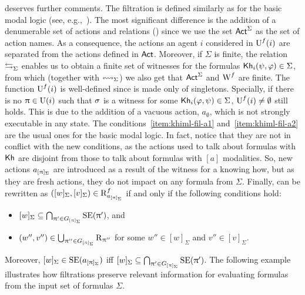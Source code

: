  deserves further comments.
The filtration is defined similarly as for the basic modal logic (see, e.g.,~\cite{mlbook}).
The most significant difference is the addition of a denumerable set of actions and relations () since we use the set ${\rm \sf Act}^\Sigma$ as the set of action names.
As a consequence, the actions an agent $i$ considered in $\operatorname{U}^f(i)$ are separated from the actions defined in ${\rm \sf Act}$.
Moreover, if $\Sigma$ is finite, the relation $\mathrel{\leftrightarrows}_\Sigma$ enables us to obtain a finite set of witnesses for the formulas ${\sf Kh}_i(\psi,\varphi) \in \Sigma$, from which (together with $\leftrightsquigarrow_\Sigma$) we also get that ${\rm \sf Act}^\Sigma$ and $\operatorname{W}^f$ are finite.
The function $\operatorname{U}^f(i)$ is well-defined since is made only of singletons. Specially, if there is no $\uppi \in \operatorname{U}(i)$ such that $\sigma$ is a witness for some ${\sf Kh}_i(\varphi,\psi) \in \Sigma$, $\operatorname{U}^f(i)\neq \emptyset$ still holds.
This is due to the addition of a vacuous action, $a_\emptyset$, which is not strongly executable in any state.
The conditions~\ref{item:khiml-fil-a1} and~\ref{item:khiml-fil-a2} are the usual ones for the basic modal logic.
In fact, notice that they are not in conflict with the new conditions, as the actions used to talk about formulas with ${\sf Kh}$ are disjoint from those to talk about formulas with $[a]$ modalities.
So, new actions $a_{[\uppi]_\Sigma}$ are introduced as a result of the witness for a knowing how, but as they are fresh actions, they do not impact on any formula from $\Sigma$.
Finally,  can be rewritten as $([w]_\Sigma,[v]_\Sigma) \in \operatorname{R}^f_{a_{[\uppi]_\Sigma}}$ if and only if the following conditions hold:

\begin{itemize}
\item $[w]_\Sigma \subseteq \bigcap_{\uppi' \in G_{[\uppi]_\Sigma}} \operatorname{SE}(\uppi')$, and
\item $(w'',v'') \in \bigcup_{\uppi'' \in G_{[\uppi]_\Sigma}} \operatorname{R}_{\uppi''}$ for some $w'' \in [w]_\Sigma$ and $v'' \in [v]_\Sigma$.
\end{itemize}

Moreover, $[w]_\Sigma \in \operatorname{SE}(a_{[\uppi]_\Sigma})$ iff $[w]_\Sigma \subseteq \bigcap_{\uppi' \in G_{[\uppi]_\Sigma}} \operatorname{SE}(\uppi')$.
The following example illustrates how filtrations preserve relevant information for evaluating formulas from the input set of formulas $\Sigma$.

\medskip

